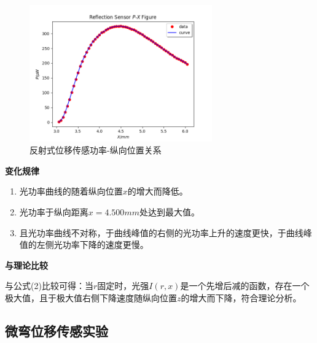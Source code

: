 \documentclass[a4paper,UTF8]{ctexart}
\begin{document}
\begin{figure}[H]
    \centering
    \begin{minipage}[b]{0.9\textwidth}
        \centering
        \includegraphics[width=0.7\textwidth]{./two.png}
        \caption{反射式位移传感功率-纵向位置关系}
    \end{minipage}
\end{figure}

{\bfseries 变化规律}

\begin{enumerate}
    \item 光功率曲线的随着纵向位置$x$的增大而降低。
    \item 光功率于纵向距离$x=4.500mm$处达到最大值。
    \item 且光功率曲线不对称，于曲线峰值的右侧的光功率上升的速度更快，于曲线峰值的左侧光功率下降的速度更慢。
\end{enumerate}

{\bfseries 与理论比较}

与公式(2)比较可得：当$r$固定时，光强$I(r,x)$是一个先增后减的函数，存在一个极大值，且于极大值右侧下降速度随纵向位置$z$的增大而下降，符合理论分析。

\subsection{微弯位移传感实验}
\end{document}
